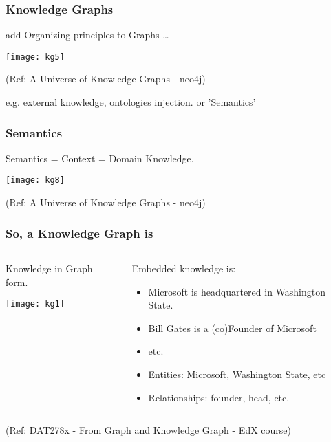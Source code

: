 \begin{frame}[fragile]\frametitle{Knowledge Graphs}
 
 add Organizing principles to Graphs \ldots
 
 
			\begin{center}
			\texttt{[image: kg5]}
			\end{center}	
			
			{\tiny (Ref: A Universe of Knowledge Graphs - neo4j)}
		
		e.g. external knowledge, ontologies injection. or 'Semantics'
		
\end{frame}


\begin{frame}[fragile]\frametitle{Semantics}
 
Semantics = Context = Domain Knowledge. 
 
			\begin{center}
			\texttt{[image: kg8]}
			\end{center}	
			
			{\tiny (Ref: A Universe of Knowledge Graphs - neo4j)}
		
	
\end{frame}

\begin{frame}\frametitle{So, a Knowledge Graph is}


\begin{columns}
    \begin{column}[T]{0.6\linewidth}

		Knowledge in Graph form.

			\begin{center}
			\texttt{[image: kg1]}
			\end{center}	
    \end{column}
    \begin{column}[T]{0.4\linewidth}
			Embedded knowledge is:
			\begin{itemize}
			\item Microsoft is headquartered in Washington State.
			\item Bill Gates is a (co)Founder of Microsoft
			\item etc.
			\item Entities: Microsoft, Washington State, etc
			\item Relationships: founder, head, etc.
			\end{itemize}
    \end{column}
  \end{columns}
	

  

{\tiny (Ref: DAT278x - From Graph and Knowledge Graph - EdX course)}
\end{frame}


